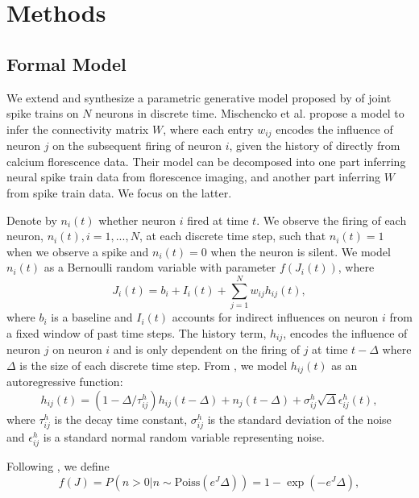 \documentclass{article}
\begin{document}
\section{Methods}

\subsection{Formal Model}
We extend and synthesize a parametric generative model proposed by
\citep{mishchencko2011} of joint spike trains on $N$ neurons in
discrete time. Mischencko
et al. propose a model to infer the connectivity matrix $W$, where
each entry $w_{ij}$ encodes the influence of neuron $j$ on the subsequent
firing of neuron $i$, given the history of directly from calcium
florescence data. Their model can be decomposed into one part
inferring neural spike train data from florescence imaging, and
another part inferring $W$ from spike train data. We focus on the
latter.

Denote by $ n_i(t) $ whether neuron $i$ fired at time $t$. We observe
the firing of each neuron, $n_i(t), i = 1,...,N$, at each discrete time step, such that $n_i(t) = 1$ when we observe a spike and $n_i(t) = 0$ when the neuron is silent. We model $n_i(t)$ as a
Bernoulli random variable with parameter $f(J_i(t))$, where
\begin{equation}\label{J}  J_i(t) = b_i + I_i(t) + \sum_{j=1}^{N}
w_{ij}h_{ij}(t), \end{equation} where $b_i$ is a baseline and $I_i(t)$
accounts for indirect influences on neuron $i$ from a fixed window of
past time steps. The history term, $h_{ij}$, encodes
the influence of neuron $j$ on neuron $i$ and is only dependent on the firing of $j$ at time $t-\Delta$ where $\Delta$ is the size of each discrete time step.
From \citep{mishchencko2011}, we model $h_{ij}(t)$ as an autoregressive function: \begin{equation}\label{h} h_{ij}(t) = (1-\Delta/\tau_{ij}^h)h_{ij}(t-\Delta)
  + n_j(t-\Delta)+\sigma_{ij}^h\sqrt{\Delta}\epsilon_{ij}^h(t), \end{equation}
where $ \tau_{ij}^h $ is the decay time constant, $\sigma_{ij}^h$ is the
standard deviation of the noise and $\epsilon_{ij}^h$ is a standard
normal random variable representing noise.

Following \citep{mishchencko2011}, we define \begin{equation}
\label{f} f(J) = P\left(n>0 | n \sim \text{Poiss}(e^J\Delta)\right) = 1 - \exp(-e^J\Delta), \end{equation}
\end{document}
